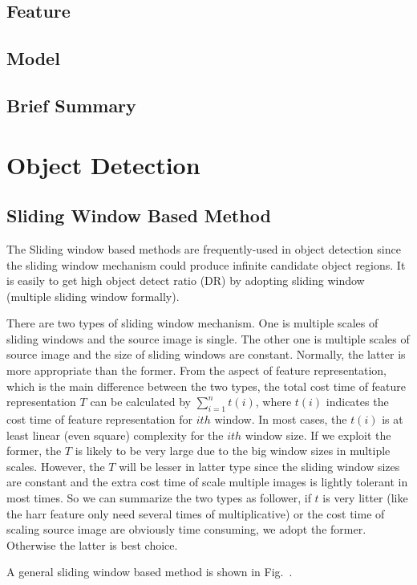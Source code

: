 \documentclass[runningheads,openany]{xhlPaper}
\begin{document}
\subsection{Feature}
\subsection{Model}
\subsection{Brief Summary}

\section{Object Detection}
\subsection{Sliding Window Based Method}
The Sliding window based methods are frequently-used in object detection since the sliding window mechanism could produce infinite candidate object regions. It is easily to get high object detect ratio (DR) by adopting sliding window (multiple sliding window formally).

There are two types of sliding window mechanism. One is multiple scales of sliding windows and the source image is single. The other one is multiple scales of source image and the size of sliding windows are constant. Normally, the latter is more appropriate than the former. 
From the aspect of feature representation, which is the main difference between the two types, the total cost time of feature representation $T$ can be calculated by $\sum_{i = 1}^{n} t(i)$, where $t(i)$ indicates the cost time of feature representation for $ith$ window. In most cases, the $t(i)$ is at least linear (even square) complexity for the $ith$ window size. If we exploit the former, the $T$ is likely to be very large due to the big window sizes in multiple scales. However, the $T$ will be lesser in latter type since the sliding window sizes are constant and the extra cost time of scale multiple images is lightly tolerant in most times. 
So we can summarize the two types as follower, if $t$ is very litter (like the harr feature only need several times of multiplicative) or the cost time of scaling source image are obviously time consuming, we adopt the former. Otherwise the latter is best choice.

A general sliding window based method is shown in Fig.~.
\end{document}
